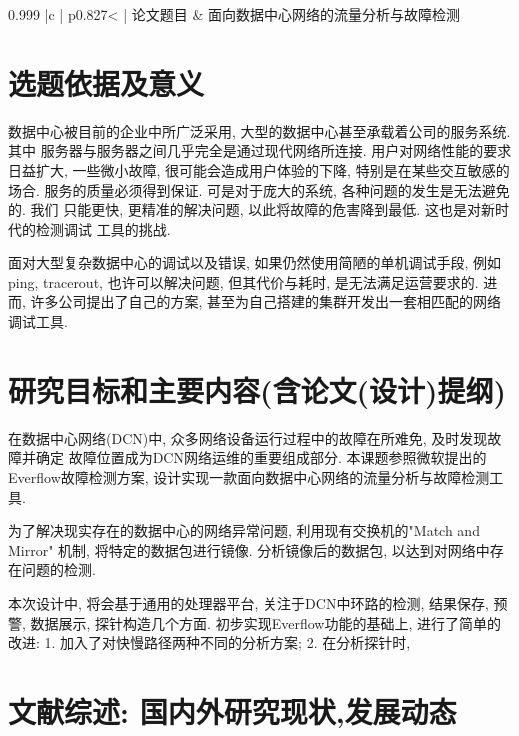 
\vspace{-4pt}
{

\noindent
\begin{tabular*}{0.999\textwidth}
    {|c | p{}< {\centering} |}
    \hline
    {\songti 论文题目} & {\songti 面向数据中心网络的流量分析与故障检测} \\ 
    \hline
\end{tabular*}
\indent

\begin{mdframed}[everyline=true]


\section{选题依据及意义}

数据中心被目前的企业中所广泛采用, 大型的数据中心甚至承载着公司的服务系统. 其中
服务器与服务器之间几乎完全是通过现代网络所连接. 用户对网络性能的要求日益扩大,
一些微小故障, 很可能会造成用户体验的下降, 特别是在某些交互敏感的场合.
服务的质量必须得到保证. 可是对于庞大的系统, 各种问题的发生是无法避免的. 我们
只能更快, 更精准的解决问题, 以此将故障的危害降到最低. 这也是对新时代的检测调试
工具的挑战.


面对大型复杂数据中心的调试以及错误, 如果仍然使用简陋的单机调试手段,
例如ping, tracerout, 也许可以解决问题, 但其代价与耗时, 是无法满足运营要求的.
进而, 许多公司提出了自己的方案, 甚至为自己搭建的集群开发出一套相匹配的网络调试工具.


\section{研究目标和主要内容(含论文(设计)提纲)}

在数据中心网络(DCN)中, 众多网络设备运行过程中的故障在所难免, 及时发现故障并确定 
故障位置成为DCN网络运维的重要组成部分. 本课题参照微软提出的Everflow故障检测方案,
设计实现一款面向数据中心网络的流量分析与故障检测工具.

为了解决现实存在的数据中心的网络异常问题, 利用现有交换机的"Match and Mirror"
机制, 将特定的数据包进行镜像. 分析镜像后的数据包, 以达到对网络中存在问题的检测.

本次设计中, 将会基于通用的处理器平台, 关注于DCN中环路的检测, 结果保存, 预警,
数据展示, 探针构造几个方面. 初步实现Everflow功能的基础上, 进行了简单的改进:
1. 加入了对快慢路径两种不同的分析方案;
2. 在分析探针时, 



\section{文献综述: 国内外研究现状,发展动态}


\end{mdframed}}
